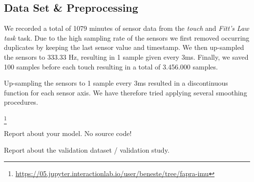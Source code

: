 \subsection{Data Set \& Preprocessing}
\label{sec:prepro}
We recorded a total of 1079 minutes of sensor data from the \textit{touch} and \textit{Fitt's Law task} task. 
Due to the high sampling rate of the sensors we first removed occurring duplicates by keeping the last sensor value and timestamp.
We then up-sampled the sensors to 333.33 Hz, resulting in 1 sample given every 3ms. 
Finally, we saved 100 samples before each touch resulting in a total of 3.456.000 samples.

Up-sampling the sensors to 1 sample every 3ms resulted in a discontinuous function for each sensor axis. 
We have therefore tried applying several smoothing procedures.


\footnote{\url{https://05.jupyter.interactionlab.io/user/beneste/tree/fapra-imu}}


Report about your model. No source code!

Report about the validation dataset / validation study. 